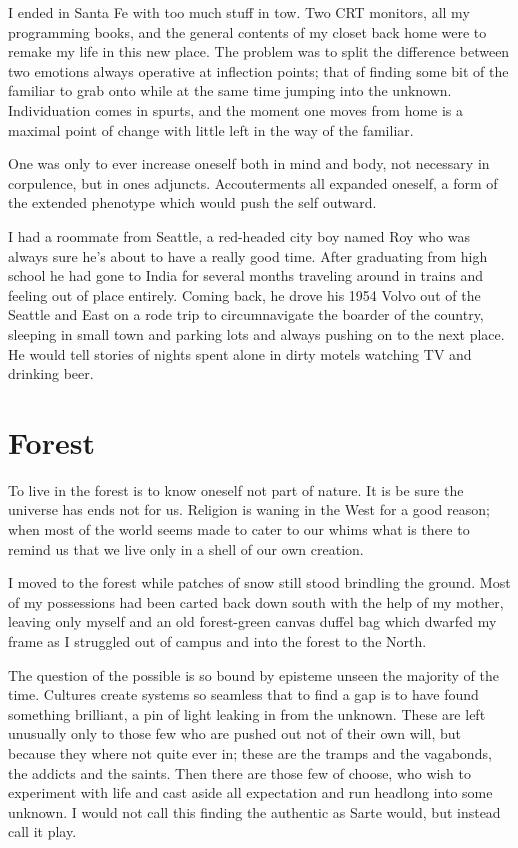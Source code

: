 \documentclass[ebook, 10pt, openright, onecolumn]{memoir}
\newcommand*\td[1]{
  \todo[inline]{
     #1 
  }
}
\newcommand*\finish{\td{ ----- Finish this section -----}}
\begin{document}
I ended in Santa Fe with too much stuff in tow.  Two CRT monitors, all my
programming books, and the general contents of my closet back home were to
remake my life in this new place.  The problem was to split the difference
between two emotions always operative at inflection points; that of finding some
bit of the familiar to grab onto while at the same time jumping into the
unknown.  Individuation comes in spurts, and the moment one moves from home
is a maximal point of change with little left in the way of the familiar. 

One was only to ever increase oneself both in mind and body, not
necessary in corpulence, but in ones adjuncts.  Accouterments all expanded
oneself, a form of the extended phenotype which would push the self outward.

I had a roommate from Seattle, a red-headed city boy named Roy who was always
sure he's about to have a really good time.  After graduating from high school
he had gone to India for several months traveling around in trains and feeling
out of place entirely.  Coming back, he drove his 1954 Volvo out of the Seattle
and East on a rode trip to circumnavigate the boarder of the country, sleeping
in small town and parking lots and always pushing on to the next place.  He
would tell stories of nights spent alone in dirty motels watching TV and
drinking beer.

\finish

\chapter{Forest}
\label{cha:forest}

To live in the forest is to know oneself not part of nature.  It is be sure the
universe has ends not for us.  Religion is waning in the West for a good
reason; when most of the world seems made to cater to our whims what is there to
remind us that we live only in a shell of our own creation.

I moved to the forest while patches of snow still stood brindling the
ground. Most of my possessions had been carted back down south with the help of
my mother, leaving only myself and an old forest-green canvas duffel bag which
dwarfed my frame as I struggled out of campus and into the forest to the North.

The question of the possible is so bound by episteme unseen the majority of the
time.  Cultures create systems so seamless that to find a gap is to have found
something brilliant, a pin of light leaking in from the unknown.  These are left
unusually only to those few who are pushed out not of their own will, but
because they where not quite ever in; these are the tramps and the vagabonds,
the addicts and the saints.  Then there are those few of choose, who wish to
experiment with life and cast aside all expectation and run headlong into some
unknown.  I would not call this finding the authentic as Sarte would, but
instead call it play.
\end{document}

